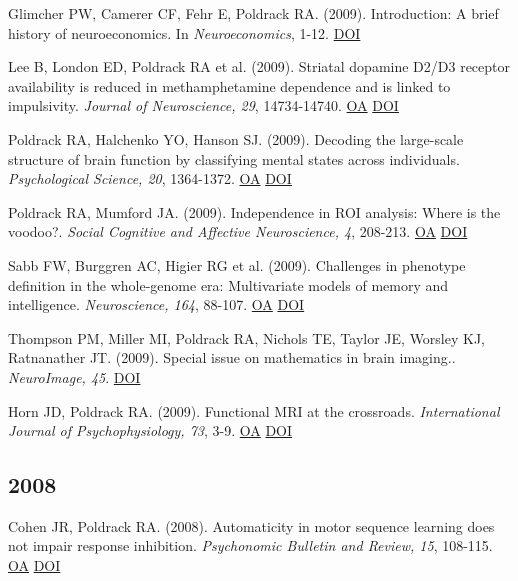 \documentclass[10pt, letterpaper]{article}
\begin{document}
Glimcher PW, Camerer CF, Fehr E, Poldrack RA.  (2009). Introduction: A brief history of neuroeconomics. In \textit{Neuroeconomics}, 1-12. \href{https://doi.org/10.1016/b978-0-12-374176-9.00001-4}{DOI} \vspace{2mm}

Lee B, London ED, Poldrack RA et al. (2009). Striatal dopamine D2/D3 receptor availability is reduced in methamphetamine dependence and is linked to impulsivity. \textit{Journal of Neuroscience, 29}, 14734-14740. \href{https://www.ncbi.nlm.nih.gov/pmc/articles/PMC2822639}{OA} \href{https://doi.org/10.1523/jneurosci.3765-09.2009}{DOI} \vspace{2mm}

Poldrack RA, Halchenko YO, Hanson SJ.  (2009). Decoding the large-scale structure of brain function by classifying mental states across individuals. \textit{Psychological Science, 20}, 1364-1372. \href{https://www.ncbi.nlm.nih.gov/pmc/articles/PMC2935493}{OA} \href{https://doi.org/10.1111/j.1467-9280.2009.02460.x}{DOI} \vspace{2mm}

Poldrack RA, Mumford JA.  (2009). Independence in ROI analysis: Where is the voodoo?. \textit{Social Cognitive and Affective Neuroscience, 4}, 208-213. \href{https://www.ncbi.nlm.nih.gov/pmc/articles/PMC2686233}{OA} \href{https://doi.org/10.1093/scan/nsp011}{DOI} \vspace{2mm}

Sabb FW, Burggren AC, Higier RG et al. (2009). Challenges in phenotype definition in the whole-genome era: Multivariate models of memory and intelligence. \textit{Neuroscience, 164}, 88-107. \href{https://www.ncbi.nlm.nih.gov/pmc/articles/PMC2766544}{OA} \href{https://doi.org/10.1016/j.neuroscience.2009.05.013}{DOI} \vspace{2mm}

Thompson PM, Miller MI, Poldrack RA, Nichols TE, Taylor JE, Worsley KJ, Ratnanather JT.  (2009). Special issue on mathematics in brain imaging.. \textit{NeuroImage, 45}. \href{https://doi.org/10.1016/j.neuroimage.2008.10.033}{DOI} \vspace{2mm}

Horn JD, Poldrack RA.  (2009). Functional MRI at the crossroads. \textit{International Journal of Psychophysiology, 73}, 3-9. \href{https://www.ncbi.nlm.nih.gov/pmc/articles/PMC2747289}{OA} \href{https://doi.org/10.1016/j.ijpsycho.2008.11.003}{DOI} \vspace{2mm}

\subsection*{2008}Cohen JR, Poldrack RA.  (2008). Automaticity in motor sequence learning does not impair response inhibition. \textit{Psychonomic Bulletin and Review, 15}, 108-115. \href{https://doi.org/10.3758/pbr.15.1.108}{OA} \href{https://doi.org/10.3758/pbr.15.1.108}{DOI} \vspace{2mm}
\end{document}
